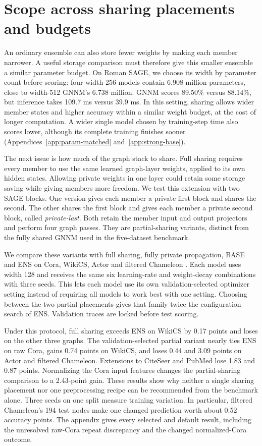 \documentclass{article}
\begin{document}
\section{Scope across sharing placements and budgets}\label{sec:additional}
An ordinary ensemble can also store fewer weights by making each member narrower. A useful storage comparison must therefore give this smaller ensemble a similar parameter budget. On Roman SAGE, we choose its width by parameter count before scoring: four width-256 models contain 6.908 million parameters, close to width-512 GNNM's 6.738 million. GNNM scores 89.50\% versus 88.14\%, but inference takes 109.7 ms versus 39.9 ms. In this setting, sharing allows wider member states and higher accuracy within a similar weight budget, at the cost of longer computation. A wider single model chosen by training-step time also scores lower, although its complete training finishes sooner (Appendices~\ref{app:param-matched} and~\ref{app:strong-base}).

The next issue is how much of the graph stack to share. Full sharing requires every member to use the same learned graph-layer weights, applied to its own hidden states. Allowing private weights in one layer could retain some storage saving while giving members more freedom. We test this extension with two SAGE blocks. One version gives each member a private first block and shares the second. The other shares the first block and gives each member a private second block, called \emph{private-last}. Both retain the member input and output projectors and perform four graph passes. They are partial-sharing variants, distinct from the fully shared GNNM used in the five-dataset benchmark.

We compare these variants with full sharing, fully private propagation, BASE and ENS on Cora, WikiCS, Actor and filtered Chameleon \citep{yang2016revisiting,mernyei2020wikics,pei2020geomgcn,platonov2023critical}. Each model uses width 128 and receives the same six learning-rate and weight-decay combinations with three seeds. This lets each model use its own validation-selected optimizer setting instead of requiring all models to work best with one setting. Choosing between the two partial placements gives that family twice the configuration search of ENS. Validation traces are locked before test scoring.

Under this protocol, full sharing exceeds ENS on WikiCS by 0.17 points and loses on the other three graphs. The validation-selected partial variant nearly ties ENS on raw Cora, gains 0.74 points on WikiCS, and loses 0.44 and 3.09 points on Actor and filtered Chameleon. Extensions to CiteSeer and PubMed lose 1.83 and 0.87 points. Normalizing the Cora input features changes the partial-sharing comparison to a 2.43-point gain. These results show why neither a single sharing placement nor one preprocessing recipe can be recommended from the benchmark alone. Three seeds on one split measure training variation. In particular, filtered Chameleon's 194 test nodes make one changed prediction worth about 0.52 accuracy points. The appendix gives every selected and default result, including the unresolved raw-Cora repeat discrepancy and the changed normalized-Cora outcome.
\end{document}
